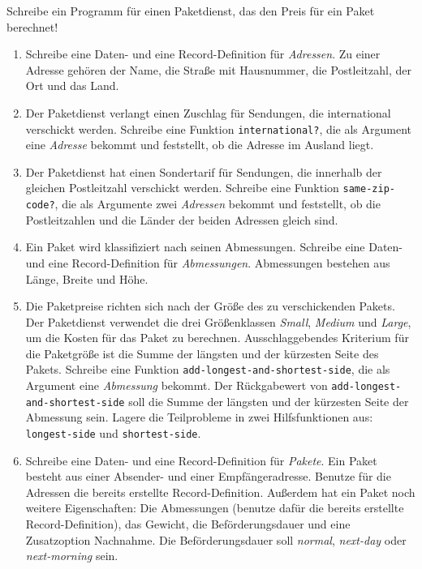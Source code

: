 \begin{aufgabe}

  Schreibe ein Programm für einen Paketdienst, das den Preis
  für ein Paket berechnet!
  \begin{enumerate}
    
  \item Schreibe eine Daten- und eine Record-Definition für
    \textit{Adressen}.  Zu einer Adresse gehören der Name, die Straße
    mit Hausnummer, die Postleitzahl, der Ort und das Land.
    
  \item Der Paketdienst verlangt einen Zuschlag für Sendungen, die
    international verschickt werden.  Schreibe eine Funktion
    \lstinline{international?}, die als Argument eine \textit{Adresse}
    bekommt und feststellt, ob die Adresse im Ausland liegt.

  \item Der Paketdienst hat einen Sondertarif für Sendungen, die
    innerhalb der gleichen Postleitzahl verschickt werden.  Schreibe
    eine Funktion \lstinline{same-zip-code?}, die als Argumente zwei
    \textit{Adressen} bekommt und feststellt, ob die Postleitzahlen
    und die Länder der beiden Adressen gleich sind.

  \item Ein Paket wird klassifiziert nach seinen Abmessungen.
    Schreibe eine Daten- und eine Record-Definition für
    \textit{Abmessungen}.  Abmessungen bestehen aus Länge, Breite und
    Höhe.

  \item Die Paketpreise richten sich nach der Größe des zu
    verschickenden Pakets.  Der Paketdienst verwendet die drei
    Größenklassen \textit{Small}, \textit{Medium} und \textit{Large},
    um die Kosten für das Paket zu berechnen.  Ausschlaggebendes
    Kriterium für die Paketgröße ist die Summe der längsten und der
    kürzesten Seite des Pakets.  Schreibe eine Funktion
    \lstinline{add-longest-and-shortest-side}, die als Argument eine
    \textit{Abmessung} bekommt.  Der Rückgabewert von
    \lstinline{add-longest-and-shortest-side} soll die Summe der längsten
    und der kürzesten Seite der Abmessung sein.  Lagere die
    Teilprobleme in zwei Hilfsfunktionen aus: \lstinline{longest-side}
    und \lstinline{shortest-side}.

  \item Schreibe eine Daten- und eine Record-Definition für
    \textit{Pakete}.  Ein Paket besteht aus einer Absender- und einer
    Empfängeradresse.  Benutze für die Adressen die bereits
    erstellte Record-Definition.  Außerdem hat ein Paket noch weitere
    Eigenschaften: Die Abmessungen (benutze dafür die bereits
    erstellte Record-Definition), das Gewicht, die Beförderungsdauer
    und eine Zusatz\-option Nachnahme.  Die Beförderungsdauer soll
    \emph{normal}, \emph{next-day} oder \emph{next-morning} sein.


\end{enumerate}
\end{aufgabe}
